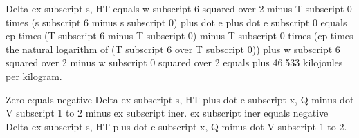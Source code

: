 Delta ex subscript s, HT equals w subscript 6 squared over 2 minus T subscript 0 times (s subscript 6 minus s subscript 0) plus dot e plus dot e subscript 0 equals cp times (T subscript 6 minus T subscript 0) minus T subscript 0 times (cp times the natural logarithm of (T subscript 6 over T subscript 0)) plus w subscript 6 squared over 2 minus w subscript 0 squared over 2 equals plus 46.533 kilojoules per kilogram.

Zero equals negative Delta ex subscript s, HT plus dot e subscript x, Q minus dot V subscript 1 to 2 minus ex subscript iner. 
ex subscript iner equals negative Delta ex subscript s, HT plus dot e subscript x, Q minus dot V subscript 1 to 2.